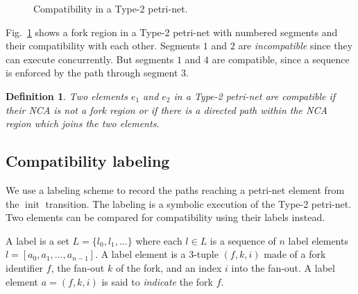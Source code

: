 \documentclass[conference]{IEEEtran}
\newtheorem{definition}{Definition}[section]
\newcommand{\sym}[1]{$\operatorname{#1}$}
\begin{document}
\begin{figure}[!t]
  \centering
  \caption{Compatibility in a Type-2 petri-net.}
  \label{figure:compatibility-fork}
\end{figure}

Fig.~\ref{figure:compatibility-fork} shows a fork region in a Type-2
petri-net with numbered segments and their compatibility with each
other. Segments $1$ and $2$ are \emph{incompatible} since they can
execute concurrently. But segments $1$ and $4$ are compatible, since a
sequence is enforced by the path through segment $3$.

\begin{definition} Two elements $e_1$ and $e_2$ in a Type-2 petri-net
are compatible if their NCA is {\em not} a fork region or if
there is a directed path within the NCA region which joins the two elements.
\end{definition}

\subsection{Compatibility labeling}

We use a labeling scheme to record the paths reaching a petri-net
element from the \sym{init} transition. The labeling is a symbolic
execution of the Type-2 petri-net. Two elements can be compared for
compatibility using their labels instead.

A label is a set $L = \{l_0,l_1,\ldots\}$ where each $l \in L$ is a
sequence of $n$ label elements $l = [a_0,a_1,\ldots,a_{n-1}]$. A label
element is a 3-tuple $(f,k,i)$ made of a fork identifier $f$, the
fan-out $k$ of the fork, and an index $i$ into the fan-out. A label
element $a = (f,k,i)$ is said to {\it indicate} the fork $f$.
\end{document}
